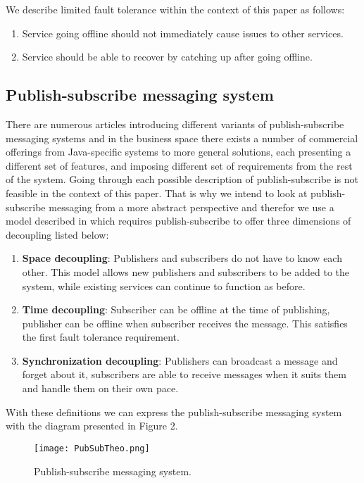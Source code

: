 \documentclass[conference]{IEEEtran}
\begin{document}
We describe limited fault tolerance within the context of this paper as follows:


\begin{enumerate}
    \item Service going offline should not immediately cause issues to other services.
    \item Service should be able to recover by catching up after going offline.
\end{enumerate}

\subsection{Publish-subscribe messaging system}
There are numerous articles introducing different variants of publish-subscribe messaging systems and in the business space there exists a number of commercial offerings from Java-specific systems to more general solutions, each presenting a different set of features, and imposing different set of requirements from the rest of the system. Going through each possible description of publish-subscribe is not feasible in the context of this paper. That is why we intend to look at publish-subscribe messaging from a more abstract perspective and therefor we use a model described in \cite{manyfaces} which requires publish-subscribe to offer three dimensions of decoupling listed below:


\begin{enumerate}
    \item \textbf{Space decoupling}: Publishers and subscribers do not have to know each other. This model allows new publishers and subscribers to be added to the system, while existing services can continue to function as before.
    \item \textbf{Time decoupling}: Subscriber can be offline at the time of publishing, publisher can be offline when subscriber receives the message. This satisfies the first fault tolerance requirement.
    \item \textbf{Synchronization decoupling}: Publishers can broadcast a message and forget about it, subscribers are able to receive messages when it suits them and handle them on their own pace.
\end{enumerate}
With these definitions we can express the publish-subscribe messaging system with the diagram presented in Figure 2.
\begin{figure}[!t]
    \centering
    \texttt{[image: PubSubTheo.png]}
    \caption{Publish-subscribe messaging system.}
\end{figure}
\end{document}
